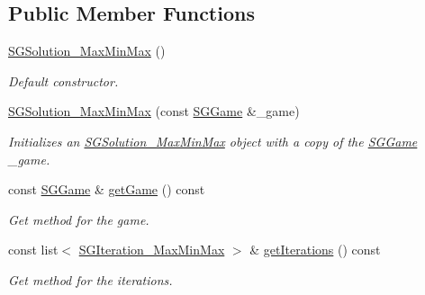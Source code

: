 \subsection*{Public Member Functions}
\begin{DoxyCompactItemize}
\item 
\mbox{\label{classSGSolution__MaxMinMax_a97ab8bfd9ea61f24533ef3c57bf9e765}} 
\hyperlink{classSGSolution__MaxMinMax_a97ab8bfd9ea61f24533ef3c57bf9e765}{S\+G\+Solution\+\_\+\+Max\+Min\+Max} ()
\begin{DoxyCompactList}\small\item\em Default constructor. \end{DoxyCompactList}\item 
\mbox{\label{classSGSolution__MaxMinMax_a2805d2c944ba8d9524d77ed2374ae601}} 
\hyperlink{classSGSolution__MaxMinMax_a2805d2c944ba8d9524d77ed2374ae601}{S\+G\+Solution\+\_\+\+Max\+Min\+Max} (const \hyperlink{classSGGame}{S\+G\+Game} \&\+\_\+game)
\begin{DoxyCompactList}\small\item\em Initializes an \hyperlink{classSGSolution__MaxMinMax}{S\+G\+Solution\+\_\+\+Max\+Min\+Max} object with a copy of the \hyperlink{classSGGame}{S\+G\+Game} \+\_\+game. \end{DoxyCompactList}\item 
\mbox{\label{classSGSolution__MaxMinMax_a2eba53c219636491429e0288ed1251f8}} 
const \hyperlink{classSGGame}{S\+G\+Game} \& \hyperlink{classSGSolution__MaxMinMax_a2eba53c219636491429e0288ed1251f8}{get\+Game} () const
\begin{DoxyCompactList}\small\item\em Get method for the game. \end{DoxyCompactList}\item 
\mbox{\label{classSGSolution__MaxMinMax_a9abb92b3922f47e9d9e659337cb987df}} 
const list$<$ \hyperlink{classSGIteration__MaxMinMax}{S\+G\+Iteration\+\_\+\+Max\+Min\+Max} $>$ \& \hyperlink{classSGSolution__MaxMinMax_a9abb92b3922f47e9d9e659337cb987df}{get\+Iterations} () const
\begin{DoxyCompactList}\small\item\em Get method for the iterations. \end{DoxyCompactList}\item 

\end{DoxyCompactItemize}
